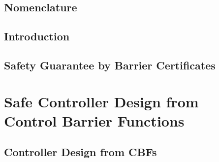 
\graphicspath{{figures/}}


	






\setcounter{page}{1}
\renewcommand{\thepage}{\Roman{page}}




\setlength\parskip{0ex}
\tableofcontents
\setlength\parskip{1ex}

\chapter*{Nomenclature}\label{chap:acronym}
\printglossary[style=mcoltree,title=Glossary] %
\printglossary[type=\acronymtype,style=glossary2col] %
\printglossary[type=symbols,style=altlong4col] %
\clearpage



\cleardoublepage
\setcounter{page}{1}
\renewcommand{\thepage}{\arabic{page}}

\chapter{Introduction}\label{chap:intro}



\chapter{Safety Guarantee by Barrier Certificates}\label{chap:barrier_cerificates}
	

\part[Safe Controller Design from Control Barrier Functions]{Safe Controller Design from \\Control Barrier Functions}\label{part:cbf}
\chapter{Controller Design from CBFs}\label{chap:cbf}
	
